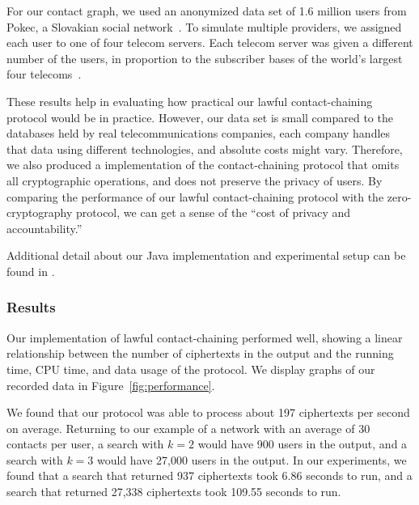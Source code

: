 For our contact graph, we used an anonymized data set of 1.6
million users from Pokec, a Slovakian social network~\cite{snapnets}. To
simulate multiple providers, we assigned each user to one of four
telecom servers.
Each telecom server was given a different number of the users,
in proportion to the subscriber bases
of the world's largest four telecoms~\cite{mobiforge}.

These results help in evaluating how practical our lawful
contact-chaining protocol would be in practice.
However, our data set is small compared to
the data\-ba\-ses held by real telecommunications companies, each company
handles that data using different technologies, and absolute costs
might vary.
Therefore, we also produced a implementation of the contact-chaining protocol
that omits all cryptographic operations, and does not
preserve the privacy of users. By comparing the performance of our lawful
contact-chaining protocol with the zero-cryptography protocol,
we can get a sense of the ``cost of privacy and accountability.'' 

Additional detail about our Java implementation and experimental setup can be found in \cite[Section 4.3]{sff-TR}.

\subsubsection{Results}

Our implementation of lawful contact-chaining performed well,
showing a linear relationship between the number of ciphertexts in the output
and the running time, CPU time, and data usage of the protocol. We display
graphs of our recorded data in Figure~\ref{fig:performance}. 

We found that our protocol was able to process about 197
ciphertexts per second on average.
Returning to our example of a network with
an average of 30 contacts per user, a search with $k=2$
would have 900 users in the output, and a search with $k=3$ would have 27,000
users in the output. In our experiments,
we found that a search that returned 937 ciphertexts took 6.86 seconds to run,
and a search that returned 27,338 ciphertexts took 109.55 seconds to run. 


